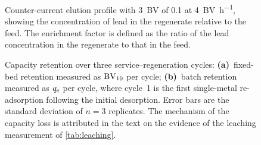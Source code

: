 \begin{figure}[htbp]
  \centering
  \caption[Counter-current elution profile]{Counter-current elution profile with \SI{3}{BV} of \SI{0.1}{\molar}  at \SI{4}{BV\per\hour}, showing the concentration of lead in the regenerate relative to the feed. The enrichment factor is defined as the ratio of the lead concentration in the regenerate to that in the feed.}
  \label{fig:elution}
\end{figure}

\begin{figure}[htbp]
  \centering
  \caption[Capacity retention over three cycles]{Capacity retention over three service--regeneration cycles: \textbf{(a)}~fixed-bed retention measured as $\mathrm{BV}_{10}$ per cycle; \textbf{(b)}~batch retention measured as $q_{\mathrm{e}}$ per cycle, where cycle~1 is the first single-metal re-adsorption following the initial desorption. Error bars are the standard deviation of $n = 3$ replicates. The mechanism of the capacity loss is attributed in the text on the evidence of the leaching measurement of \cref{tab:leaching}.}
  \label{fig:retention}
\end{figure}

\begin{table}[htbp]
  \centering
  \caption[Fixed-bed parameters and column model fits]{Fixed-bed parameters and column model fits: bed characterisation, breakthrough bed volumes, dynamic column capacity by numerical integration and its utilisation relative to the batch equilibrium capacity, enrichment and desorption efficiency per cycle, mass-balance closure, and the Thomas, Yoon--Nelson and Adams--Bohart parameters with their fit statistics.}
  \label{tab:column-models}
\end{table}

